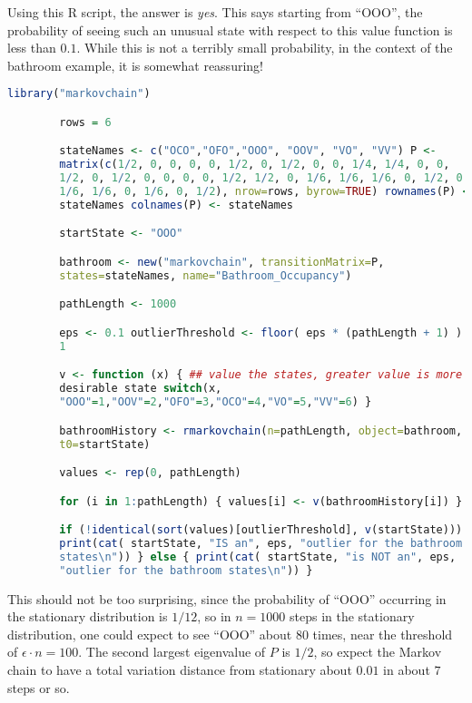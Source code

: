 \documentclass[12pt]{article}
\begin{document}
\begin{solution}
    Using this R script, the answer is \emph{yes}.  This says starting
    from ``OOO'', the probability of seeing such an unusual state with
    respect to this value function is less than \( 0.1 \).  While this
    is not a terribly small probability, in the context of the bathroom
    example, it is somewhat reassuring!

    \begin{lstlisting}[language=R]
        library("markovchain")

        rows = 6

        stateNames <- c("OCO","OFO","OOO", "OOV", "VO", "VV") P <-
        matrix(c(1/2, 0, 0, 0, 0, 1/2, 0, 1/2, 0, 0, 1/4, 1/4, 0, 0,
        1/2, 0, 1/2, 0, 0, 0, 0, 1/2, 1/2, 0, 1/6, 1/6, 1/6, 0, 1/2, 0,
        1/6, 1/6, 0, 1/6, 0, 1/2), nrow=rows, byrow=TRUE) rownames(P) <-
        stateNames colnames(P) <- stateNames

        startState <- "OOO"

        bathroom <- new("markovchain", transitionMatrix=P,
        states=stateNames, name="Bathroom_Occupancy")

        pathLength <- 1000

        eps <- 0.1 outlierThreshold <- floor( eps * (pathLength + 1) ) +
        1

        v <- function (x) { ## value the states, greater value is more
        desirable state switch(x,
        "OOO"=1,"OOV"=2,"OFO"=3,"OCO"=4,"VO"=5,"VV"=6) }

        bathroomHistory <- rmarkovchain(n=pathLength, object=bathroom,
        t0=startState)

        values <- rep(0, pathLength)

        for (i in 1:pathLength) { values[i] <- v(bathroomHistory[i]) }

        if (!identical(sort(values)[outlierThreshold], v(startState))) {%
        print(cat( startState, "IS an", eps, "outlier for the bathroom
        states\n")) } else { print(cat( startState, "is NOT an", eps,
        "outlier for the bathroom states\n")) }
    \end{lstlisting}

    This should not be too surprising, since the probability of ``OOO''
    occurring in the stationary distribution is \( 1/12 \), so in \(
    n=1000 \) steps in the stationary distribution, one could expect to
    see ``OOO'' about \( 80 \) times, near the threshold of \( \epsilon
    \cdot n = 100 \).  The second largest eigenvalue of \( P \) is \(
    1/2 \), so expect the Markov chain to have a total variation
    distance from stationary about \( 0.01 \) in about \( 7 \) steps or
    so.
\end{solution}
\end{document}
